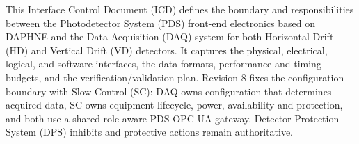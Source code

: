 
This Interface Control Document (ICD) defines the boundary and responsibilities between the Photodetector System (PDS) front-end electronics based on DAPHNE and the Data Acquisition (DAQ) system for both Horizontal Drift (HD) and Vertical Drift (VD) detectors. It captures the physical, electrical, logical, and software interfaces, the data formats, performance and timing budgets, and the verification/validation plan. Revision 8 fixes the configuration boundary with Slow Control (SC): DAQ owns configuration that determines acquired data, SC owns equipment lifecycle, power, availability and protection, and both use a shared role-aware PDS OPC-UA gateway. Detector Protection System (DPS) inhibits and protective actions remain authoritative.
